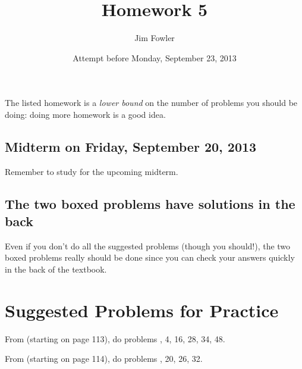 \documentclass[12pt]{handout}
\title{Homework 5}
\date{Attempt before Monday, September 23, 2013}
\author{Jim Fowler}
\begin{document}
\maketitle




The listed homework is a \textit{lower bound} on the number of
problems you should be doing: doing more homework is a good idea.


\subsection*{Midterm on Friday, September 20, 2013}
Remember to study for the upcoming midterm.




\subsection*{The two boxed problems have solutions in the back}
Even if you don't do all the suggested problems (though you should!), the two boxed problems really should be done since you can check your answers quickly in the back of the textbook.

\section*{Suggested Problems for Practice}

From  (starting on page 113),
do problems , 4, 16, 28, 34, 48.
\vspace{1ex}

From  (starting on page 114),
do problems , 20, 26, 32.
\vspace{1ex}
\end{document}
